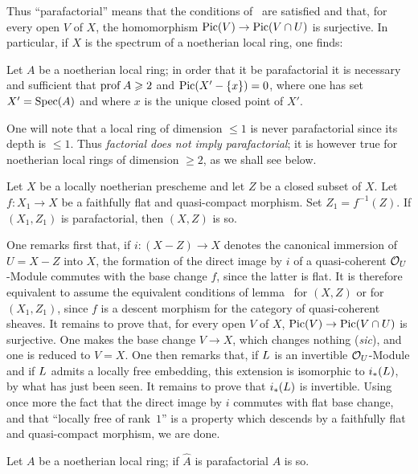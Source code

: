 Thus ``parafactorial'' means that the conditions of~ are satisfied and that, for every open $V$ of $X$, the homomorphism $\Pic(V)\to\Pic(V\cap U)$ is surjective. In particular, if $X$ is the spectrum of a noetherian local ring, one finds:

\begin{proposition} \label{XI.3.5}
Let $A$ be a noetherian local ring; in order that it be parafactorial it is necessary and sufficient that $\operatorname{prof} A\geqslant 2$ and $\operatorname{Pic}(X'-\{x\})=0$, where one has set $X'=\operatorname{Spec}(A)$ and where $x$ is the unique closed point of $X'$.
\end{proposition}

One will note that a local ring of dimension $\leq 1$ is never parafactorial since its depth is $\leq 1$. Thus \emph{factorial does not imply parafactorial}; it is however true for noetherian local rings of dimension $\geq 2$, as we shall see below.

\begin{lemma} \label{XI.3.6} Let $X$ be a locally noetherian prescheme and let $Z$ be a closed subset of $X$. Let $f\colon X_1\to X$ be a faithfully flat and quasi-compact morphism. Set $Z_1=f^{-1}(Z)$. If $(X_1, Z_1)$ is parafactorial, then $(X, Z)$ is so.
\end{lemma}

One remarks first that, if $i\colon(X-Z)\to X$ denotes the canonical immersion of $U=X-Z$ into $X$, the formation of the direct image by $i$ of a quasi-coherent ${\mathcal O}_U$-Module commutes with the base change $f$, since the latter is flat. It is therefore equivalent to assume the equivalent conditions of lemma~ for $(X, Z)$ or for $(X_1, Z_1)$, since $f$ is a descent morphism for the category of quasi-coherent sheaves. It remains to prove that, for every open $V$ of $X$, $\Pic(V)\to\Pic(V\cap U)$ is surjective. One makes the base change $V\to X$, which changes nothing (\textit{sic}), and one is reduced to $V=X$. One then remarks that, if ${L}$ is an invertible ${\mathcal O}_U$-Module and if ${L}$ admits a locally free embedding, this extension is isomorphic to $i_*({L})$, by what has just been seen. It remains to prove that $i_*({L})$ is invertible. Using once more the fact that the direct image by $i$ commutes with flat base change, and that ``locally free of rank~$1$'' is a property which descends by a faithfully flat and quasi-compact morphism, we are done.

\begin{corollary} \label{XI.3.7} Let $A$ be a noetherian local ring; if $\hat A$ is parafactorial $A$ is so.
\end{corollary}

